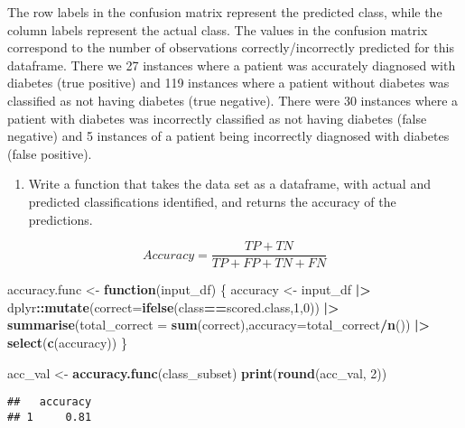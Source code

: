 \documentclass[
]{article}
\newenvironment{Shaded}{\begin{snugshade}}{\end{snugshade}}
\newcommand{\AttributeTok}[1]{\textcolor[rgb]{0.13,0.29,0.53}{#1}}
\newcommand{\ControlFlowTok}[1]{\textcolor[rgb]{0.13,0.29,0.53}{\textbf{#1}}}
\newcommand{\DecValTok}[1]{\textcolor[rgb]{0.00,0.00,0.81}{#1}}
\newcommand{\FunctionTok}[1]{\textcolor[rgb]{0.13,0.29,0.53}{\textbf{#1}}}
\newcommand{\NormalTok}[1]{#1}
\newcommand{\OtherTok}[1]{\textcolor[rgb]{0.56,0.35,0.01}{#1}}
\newcommand{\SpecialCharTok}[1]{\textcolor[rgb]{0.81,0.36,0.00}{\textbf{#1}}}
\providecommand{\tightlist}{%
  \setlength{\itemsep}{0pt}\setlength{\parskip}{0pt}}
\begin{document}
The row labels in the confusion matrix represent the predicted class,
while the column labels represent the actual class. The values in the
confusion matrix correspond to the number of observations
correctly/incorrectly predicted for this dataframe. There we 27
instances where a patient was accurately diagnosed with diabetes (true
positive) and 119 instances where a patient without diabetes was
classified as not having diabetes (true negative). There were 30
instances where a patient with diabetes was incorrectly classified as
not having diabetes (false negative) and 5 instances of a patient being
incorrectly diagnosed with diabetes (false positive).

\begin{enumerate}
\def\labelenumi{\arabic{enumi}.}
\setcounter{enumi}{2}
\tightlist
\item
  Write a function that takes the data set as a dataframe, with actual
  and predicted classifications identified, and returns the accuracy of
  the predictions.
\end{enumerate}

\[Accuracy = \frac{TP + TN}{TP + FP + TN + FN}\]

\begin{Shaded}
\begin{Highlighting}[]
\NormalTok{accuracy.func }\OtherTok{\textless{}{-}} \ControlFlowTok{function}\NormalTok{(input\_df) \{}
\NormalTok{    accuracy }\OtherTok{\textless{}{-}}\NormalTok{ input\_df }\SpecialCharTok{|\textgreater{}}\NormalTok{ dplyr}\SpecialCharTok{::}\FunctionTok{mutate}\NormalTok{(}\AttributeTok{correct=}\FunctionTok{ifelse}\NormalTok{(class}\SpecialCharTok{==}\NormalTok{scored.class,}\DecValTok{1}\NormalTok{,}\DecValTok{0}\NormalTok{)) }\SpecialCharTok{|\textgreater{}} \FunctionTok{summarise}\NormalTok{(}\AttributeTok{total\_correct =} \FunctionTok{sum}\NormalTok{(correct),}\AttributeTok{accuracy=}\NormalTok{total\_correct}\SpecialCharTok{/}\FunctionTok{n}\NormalTok{()) }\SpecialCharTok{|\textgreater{}} \FunctionTok{select}\NormalTok{(}\FunctionTok{c}\NormalTok{(accuracy))}
\NormalTok{\}}

\NormalTok{acc\_val }\OtherTok{\textless{}{-}} \FunctionTok{accuracy.func}\NormalTok{(class\_subset)}
\FunctionTok{print}\NormalTok{(}\FunctionTok{round}\NormalTok{(acc\_val, }\DecValTok{2}\NormalTok{))}
\end{Highlighting}
\end{Shaded}

\begin{verbatim}
##   accuracy
## 1     0.81
\end{verbatim}
\end{document}
